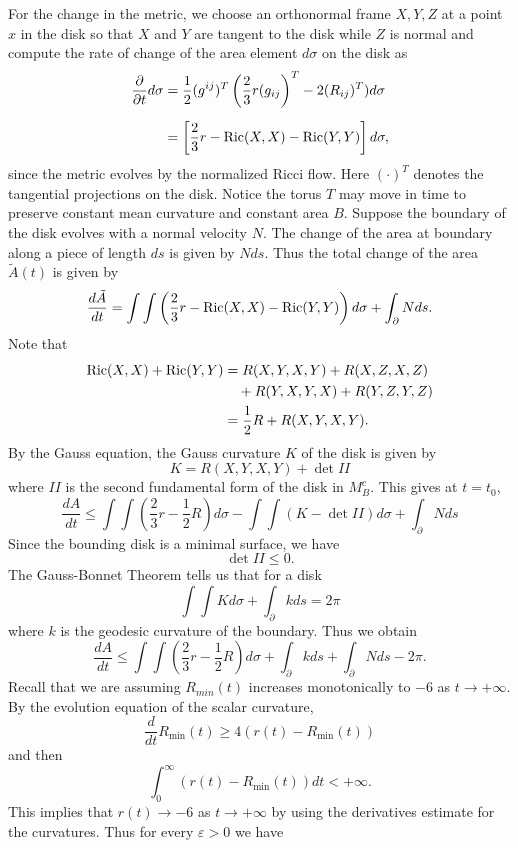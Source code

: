 For the change in the metric, we choose an orthonormal frame
$X,Y,Z$ at a point $x$ in the disk so that $X$ and $Y$ are tangent
to the disk while $Z$ is normal and compute the rate of change of
the area element $d\sigma$ on the disk as
\begin{align*}
\frac{\partial}{\partial t}d\sigma&  =
\frac{1}{2}(g^{ij})^T\left(\frac{2}{3}r(g_{ij}\right)^T-2(R_{ij})^T)d\sigma\\[2mm]
&  = \left[\frac{2}{3}r-\operatorname{Ric}(X,X)-\operatorname{Ric}(Y,Y)\right]d\sigma,
\end{align*}
since the metric evolves by the normalized Ricci flow. Here
$(\cdot)^T$ denotes the tangential projections on the disk. Notice
the torus $T$ may move in time to preserve constant mean curvature
and constant area $B$. Suppose the boundary of the disk evolves
with a normal velocity $N$. The change of the area at boundary
along a piece of length $ds$ is given by $Nds$. Thus the total
change of the area $\tilde{A}(t)$ is given by
$$
\frac{d\tilde{A}}{dt}
=\int\int\left(\frac{2}{3}r-\operatorname{Ric}(X,X)-\operatorname{Ric}(Y,Y)\right)d\sigma
+\int_\partial Nds.
$$
Note that
\begin{align*}
\operatorname{Ric}(X,X)+\operatorname{Ric}(Y,Y)&  = R(X,Y,X,Y)+R(X,Z,X,Z)\\
&\quad +R(Y,X,Y,X)+R(Y,Z,Y,Z)\\
&  = \frac{1}{2}R+R(X,Y,X,Y).
\end{align*}
By the Gauss equation, the Gauss curvature $K$ of the disk is
given by
$$
K=R(X,Y,X,Y)+\det II
$$
where $II$ is the second fundamental form of the disk in $M_B^c$.
This gives at $t=t_0$,
$$
\frac{dA}{dt}\leq\int\int\left(\frac{2}{3}r-\frac{1}{2}R\right)d\sigma
-\int\int(K-\det II)d\sigma+\int_\partial N ds
$$
Since the bounding disk is a minimal surface, we have
$$
\det II\leq 0.
$$
The Gauss-Bonnet Theorem tells us that for a disk
$$
\int\int Kd\sigma+\int_\partial k ds=2\pi
$$
where $k$ is the geodesic curvature of the boundary. Thus we
obtain \begin{equation} \frac{dA}{dt}\leq
\int\int\left(\frac{2}{3}r-\frac{1}{2}R\right)d\sigma+\int_\partial
kds+\int_\partial Nds -2\pi. %
\end{equation} Recall that we are assuming $R_{min}(t)$ increases
monotonically to $-6$ as $t\rightarrow +\infty$. By the evolution
equation of the scalar curvature,
$$
\frac{d}{dt}R_{\min}(t)\geq 4(r(t)-R_{\min}(t))
$$
and then
$$
\int_0^\infty (r(t)-R_{\min}(t))dt<+\infty.
$$
This implies that $r(t)\rightarrow -6$ as $t\rightarrow +\infty$
by using the derivatives estimate for the curvatures. Thus for
every $\varepsilon >0$ we have
